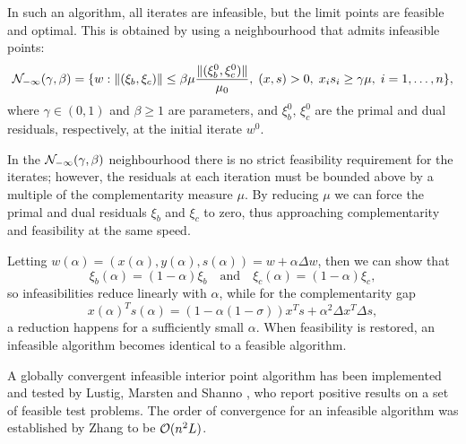 In such 
an algorithm, all iterates are infeasible, but the limit points 
are feasible and optimal. This is obtained by using a 
neighbourhood that admits infeasible points:
\[
\mathcal{N}_{-\infty}(\gamma,\beta) =\{ w :
           \|(\xi_b,\xi_c)\| \le \beta\mu \frac{\|(\xi_b^0,\xi_c^0)\|}{\mu_0}, 
	   \; (x,s)>0, \; x_is_i \ge \gamma\mu, \; i = 1, \ldots, n \},
\]
where $\gamma\in (0,1)$ and $\beta \ge 1$ are parameters, and 
$\xi_b^0,\,\xi_c^0$ are the primal and dual residuals, respectively, 
at the initial iterate $w^0$.

In the $\mathcal{N}_{-\infty}(\gamma,\beta)$ neighbourhood
there is no strict feasibility requirement for 
the iterates; however, the residuals at each iteration must be 
bounded above by a multiple of the complementarity measure $\mu$. 
By reducing $\mu$ we can force the primal and dual residuals 
$\xi_b$ and $\xi_c$ to zero, thus approaching complementarity and 
feasibility at the same speed.


Letting 
$w(\alpha) = (x(\alpha),y(\alpha),s(\alpha)) = w + \alpha\Delta w$,
then we can show that
\[
  \xi_b(\alpha) = (1-\alpha) \xi_b \quad \text{and} \quad 
  \xi_c(\alpha) = (1-\alpha) \xi_c,
\]
so infeasibilities reduce linearly with $\alpha$, while for the 
complementarity gap
\[
  x(\alpha)^Ts(\alpha)=(1-\alpha(1 -\sigma))x^Ts +\alpha^2 \Delta x^T \Delta s,
\]
a reduction happens for a sufficiently small $\alpha$. 
When feasibility is restored, an infeasible algorithm becomes identical
to a feasible algorithm. 

A globally convergent infeasible interior point algorithm has
been implemented and tested by Lustig, Marsten and Shanno
\cite{LustigMarstenShanno94b}, who report positive results on
a set of feasible test problems.
The order of convergence for an infeasible algorithm was
established by Zhang \cite{Zhang94} to be $\mathcal{O}(n^2L)$.


